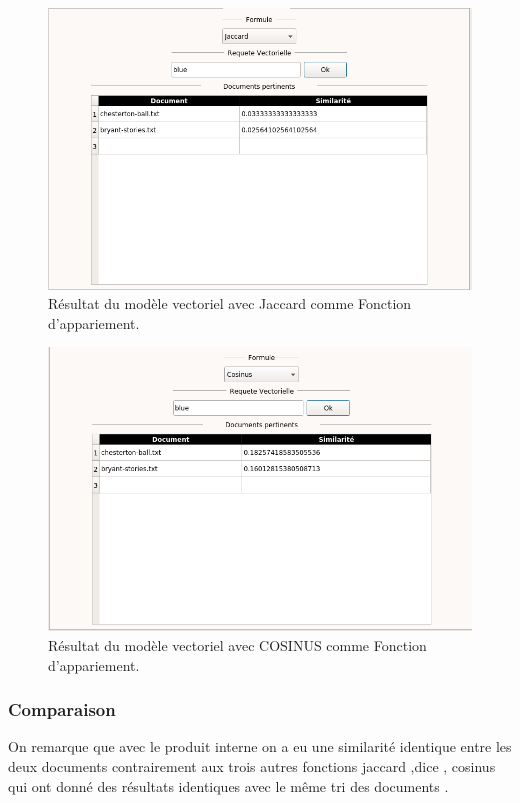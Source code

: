 \documentclass[12pt,a4paper,oneside]{article}
\begin{document}
\begin{figure}[H]
	\centering
	\includegraphics[scale=0.4]{images/jaccard.png}
	\caption{Résultat du modèle vectoriel avec Jaccard comme Fonction d'appariement.}
\end{figure}
\begin{figure}[H]
	\centering
	\includegraphics[scale=0.4]{images/cosinus.png}
	\caption{Résultat du modèle vectoriel avec COSINUS comme Fonction d'appariement.}
\end{figure}




\subsubsection*{Comparaison}
On remarque que avec le produit interne on a eu une similarité identique entre les deux documents contrairement aux trois autres fonctions jaccard ,dice , cosinus qui ont donné des résultats identiques avec le même tri des documents .
\end{document}
